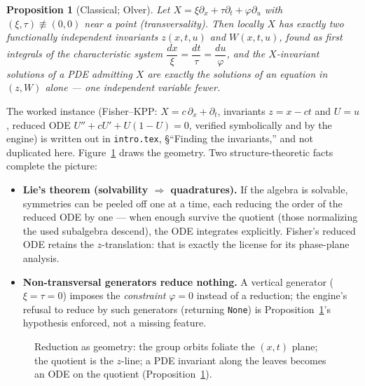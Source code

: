 \documentclass[11pt]{article}
\theoremstyle{plain}
\newtheorem{proposition}[theorem]{Proposition}
\theoremstyle{definition}
\theoremstyle{remark}
\begin{document}
\begin{proposition}[Classical; Olver]\label{prop:reduce}
Let $X=\xi\partial_x+\tau\partial_t+\varphi\partial_u$ with $(\xi,\tau)\not\equiv(0,0)$ near a point
(\emph{transversality}). Then locally $X$ has exactly two functionally independent invariants
$z(x,t,u)$ and $W(x,t,u)$, found as first integrals of the characteristic system
$\dfrac{dx}{\xi}=\dfrac{dt}{\tau}=\dfrac{du}{\varphi}$, and the $X$-invariant solutions of a PDE
admitting $X$ are exactly the solutions of an equation in $(z,W)$ alone --- one independent variable
fewer.
\end{proposition}

The worked instance (Fisher--KPP: $X=c\,\partial_x+\partial_t$, invariants $z=x-ct$ and $U=u$,
reduced ODE $U''+cU'+U(1-U)=0$, verified symbolically and by the engine) is written out in
\texttt{intro.tex}, \S``Finding the invariants,'' and not duplicated here. Figure~\ref{fig:foliation}
draws the geometry. Two structure-theoretic facts complete the picture:

\begin{itemize}[nosep]
\item \textbf{Lie's theorem (solvability $\Rightarrow$ quadratures).} If the algebra is solvable,
  symmetries can be peeled off one at a time, each reducing the order of the reduced ODE by one ---
  when enough survive the quotient (those normalizing the used subalgebra descend), the ODE
  integrates explicitly. Fisher's reduced ODE retains the $z$-translation: that is exactly the
  license for its phase-plane analysis.
\item \textbf{Non-transversal generators reduce nothing.} A vertical generator
  ($\xi=\tau=0$) imposes the \emph{constraint} $\varphi=0$ instead of a reduction; the engine's
  refusal to reduce by such generators (returning \texttt{None}) is Proposition~\ref{prop:reduce}'s
  hypothesis enforced, not a missing feature.
\end{itemize}

\begin{figure}[ht]\centering
{}
\caption{Reduction as geometry: the group orbits foliate the $(x,t)$ plane; the quotient is the
$z$-line; a PDE invariant along the leaves becomes an ODE on the quotient
(Proposition~\ref{prop:reduce}).}
\label{fig:foliation}
\end{figure}
\end{document}

